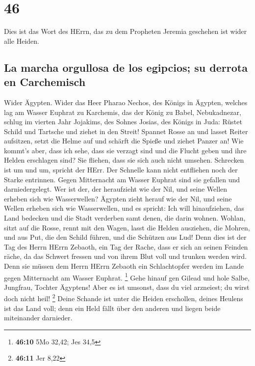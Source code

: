 \hypertarget{section-45}{%
\section{46}\label{section-45}}

 Dies ist das Wort des HErrn, das zu dem Propheten Jeremia
geschehen ist wider alle Heiden.

\hypertarget{la-marcha-orgullosa-de-los-egipcios-su-derrota-en-carchemisch}{%
\subsection{La marcha orgullosa de los egipcios; su derrota en
Carchemisch}\label{la-marcha-orgullosa-de-los-egipcios-su-derrota-en-carchemisch}}

 Wider Ägypten. Wider das Heer Pharao Nechos, des Königs
in Ägypten, welches lag am Wasser Euphrat zu Karchemis, das der König zu
Babel, Nebukadnezar, schlug im vierten Jahr Jojakims, des Sohnes Josias,
des Königs in Juda:  Rüstet Schild und Tartsche und ziehet
in den Streit!  Spannet Rosse an und lasset Reiter
aufsitzen, setzt die Helme auf und schärft die Spieße und ziehet Panzer
an!  Wie kommt's aber, dass ich sehe, dass sie verzagt
sind und die Flucht geben und ihre Helden erschlagen sind? Sie fliehen,
dass sie sich auch nicht umsehen. Schrecken ist um und um, spricht der
HErr.  Der Schnelle kann nicht entfliehen noch der Starke
entrinnen. Gegen Mitternacht am Wasser Euphrat sind sie gefallen und
darniedergelegt.  Wer ist der, der heraufzieht wie der
Nil, und seine Wellen erheben sich wie Wasserwellen? 
Ägypten zieht herauf wie der Nil, und seine Wellen erheben sich wie
Wasserwellen, und es spricht: Ich will hinaufziehen, das Land bedecken
und die Stadt verderben samt denen, die darin wohnen. 
Wohlan, sitzt auf die Rosse, rennt mit den Wagen, lasst die Helden
ausziehen, die Mohren, und aus Put, die den Schild führen, und die
Schützen aus Lud!  Denn dies ist der Tag des Herrn HErrn
Zebaoth, ein Tag der Rache, dass er sich an seinen Feinden räche, da das
Schwert fressen und von ihrem Blut voll und trunken werden wird. Denn
sie müssen dem Herrn HErrn Zebaoth ein Schlachtopfer werden im Lande
gegen Mitternacht am Wasser Euphrat. \footnote{\textbf{46:10} 5Mo 32,42;
  Jes 34,5}  Gehe hinauf gen Gilead und hole Salbe,
Jungfrau, Tochter Ägyptens! Aber es ist umsonst, dass du viel arzneiest;
du wirst doch nicht heil! \footnote{\textbf{46:11} Jer 8,22}
 Deine Schande ist unter die Heiden erschollen, deines
Heulens ist das Land voll; denn ein Held fällt über den anderen und
liegen beide miteinander darnieder.

